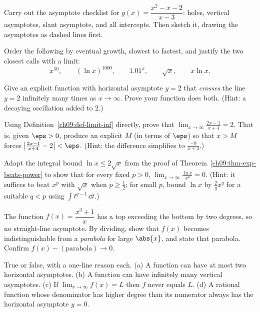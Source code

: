 \begin{exercise}
Carry out the asymptote checklist for $g(x)=\dfrac{x^2-x-2}{x-3}$: holes,
vertical asymptotes, slant asymptote, and all intercepts. Then sketch it,
drawing the asymptotes as dashed lines first.
\end{exercise}

\begin{exercise}
Order the following by eventual growth, slowest to fastest, and justify the two
closest calls with a limit:
\[
   x^{50},\qquad (\ln x)^{1000},\qquad 1.01^{x},\qquad \sqrt{x},\qquad x\ln x.
\]
\end{exercise}

\begin{exercise}
Give an explicit function with horizontal asymptote $y=2$ that \emph{crosses}
the line $y=2$ infinitely many times as $x\to\infty$. Prove your function does
both. (Hint: a decaying oscillation added to $2$.)
\end{exercise}

\begin{exercise}
Using Definition~\ref{ch09:def-limit-inf} directly, prove that
$\displaystyle\lim_{x\to\infty}\frac{2x-1}{x+4}=2$. That is, given $\eps>0$,
produce an explicit $M$ (in terms of $\eps$) so that $x>M$ forces
$\bigl|\frac{2x-1}{x+4}-2\bigr|<\eps$. (Hint: the difference simplifies to
$\frac{-9}{x+4}$.)
\end{exercise}

\begin{exercise}
Adapt the integral bound $\ln x\le 2\sqrt x$ from the proof of
Theorem~\ref{ch09:thm-exp-beats-power} to show that for every fixed $p>0$,
$\displaystyle\lim_{x\to\infty}\frac{\ln x}{x^{p}}=0$. (Hint: it suffices to
beat $x^p$ with $\sqrt x$ when $p\ge \tfrac12$; for small $p$, bound $\ln x$ by
$\tfrac{2}{q}x^{q}$ for a suitable $q<p$ using $\int t^{q-1}\,\dd t$.)
\end{exercise}

\begin{exercise}
The function $f(x)=\dfrac{x^3+1}{x}$ has a top exceeding the bottom by two
degrees, so no straight-line asymptote. By dividing, show that $f(x)$ becomes
indistinguishable from a \emph{parabola} for large $\abs{x}$, and state that
parabola. Confirm $f(x)-(\text{parabola})\to 0$.
\end{exercise}

\begin{exercise}[Conceptual]
True or false, with a one-line reason each. (a) A function can have at most two
horizontal asymptotes. (b) A function can have infinitely many vertical
asymptotes. (c) If $\lim_{x\to\infty}f(x)=L$ then $f$ never equals $L$. (d) A
rational function whose denominator has higher degree than its numerator always
has the horizontal asymptote $y=0$.
\end{exercise}
